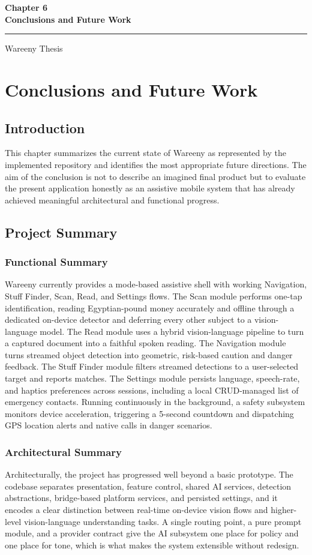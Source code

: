 \documentclass[12pt,a4paper]{report}
\newcommand{\chaptercover}[1]{%
  \clearpage
  \thispagestyle{empty}
  \vspace*{\fill}
  \begin{center}
    {\Huge\bfseries #1\par}
    \vspace{0.8cm}
    \rule{0.35\textwidth}{1pt}\par
    \vspace{0.6cm}
    {\Large Wareeny Thesis\par}
  \end{center}
  \vspace*{\fill}
  \clearpage
}
\begin{document}
\chaptercover{Chapter 6\\Conclusions and Future Work}
\chapter{Conclusions and Future Work}

\section{Introduction}
This chapter summarizes the current state of Wareeny as represented by the implemented repository and identifies the most appropriate future directions. The aim of the conclusion is not to describe an imagined final product but to evaluate the present application honestly as an assistive mobile system that has already achieved meaningful architectural and functional progress.

\section{Project Summary}
\subsection{Functional Summary}
Wareeny currently provides a mode-based assistive shell with working Navigation, Stuff Finder, Scan, Read, and Settings flows. The Scan module performs one-tap identification, reading Egyptian-pound money accurately and offline through a dedicated on-device detector and deferring every other subject to a vision-language model. The Read module uses a hybrid vision-language pipeline to turn a captured document into a faithful spoken reading. The Navigation module turns streamed object detection into geometric, risk-based caution and danger feedback. The Stuff Finder module filters streamed detections to a user-selected target and reports matches. The Settings module persists language, speech-rate, and haptics preferences across sessions, including a local CRUD-managed list of emergency contacts. Running continuously in the background, a safety subsystem monitors device acceleration, triggering a 5-second countdown and dispatching GPS location alerts and native calls in danger scenarios.

\subsection{Architectural Summary}
Architecturally, the project has progressed well beyond a basic prototype. The codebase separates presentation, feature control, shared AI services, detection abstractions, bridge-based platform services, and persisted settings, and it encodes a clear distinction between real-time on-device vision flows and higher-level vision-language understanding tasks. A single routing point, a pure prompt module, and a provider contract give the AI subsystem one place for policy and one place for tone, which is what makes the system extensible without redesign.
\end{document}

